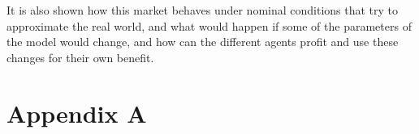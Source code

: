 \documentclass[12pt]{article}
\begin{document}
It is also shown how this market behaves under nominal conditions that try to approximate the real world, and what would happen if some of the parameters of the model would change, and how can the different agents profit and use these changes for their own benefit.

\newpage
\label{Bibliography}




\newpage
\appendix
\section{Appendix A}
\label{AppA}

\end{document}
